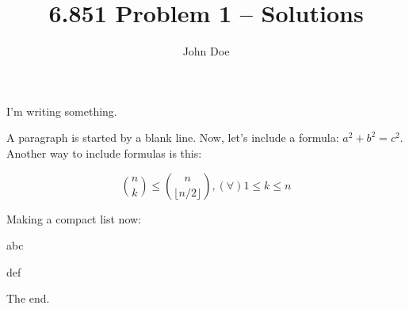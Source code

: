 \documentclass[10pt]{article}
\author{John Doe}
\title{6.851 Problem 1 -- Solutions}
\newenvironment{itemize*}%
  {\vspace{-2ex} \begin{itemize} %
     \setlength{\itemsep}{-1ex} \setlength{\parsep}{0pt}}%
  {\end{itemize}}
\begin{document}
\maketitle

I'm writing something.

A paragraph is started by a blank line. Now, let's include a formula: 
$a^2 + b^2 = c^2$. Another way to include formulas is this:

\[ \binom{n}{k} \le \binom{n}{\lfloor n/2 \rfloor}, (\forall) 1 \le k \le n \]

Making a compact list now:

\begin{itemize*}
\item abc
\item def
\end{itemize*}

The end.
\end{document}
